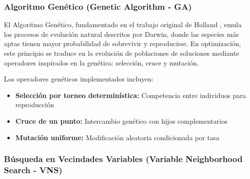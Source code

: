 \subsubsection{Algoritmo Genético (Genetic Algorithm - GA)}

El Algoritmo Genético, fundamentado en el trabajo original de Holland \cite{holland1992adaptation}, emula los procesos de evolución natural descritos por Darwin, donde las especies más aptas tienen mayor probabilidad de sobrevivir y reproducirse. En optimización, este principio se traduce en la evolución de poblaciones de soluciones mediante operadores inspirados en la genética: selección, cruce y mutación.

\begin{table}[htbp]
\centering
{}
\caption{Configuración de parámetros del algoritmo GA.}
\label{tab:parametros_ga}
\end{table}

Los operadores genéticos implementados incluyen:
\begin{itemize}
    \item \textbf{Selección por torneo determinística:} Competencia entre individuos para reproducción
    \item \textbf{Cruce de un punto:} Intercambio genético con hijos complementarios
    \item \textbf{Mutación uniforme:} Modificación aleatoria condicionada por tasa
\end{itemize}

\subsubsection{Búsqueda en Vecindades Variables (Variable Neighborhood Search - VNS)}


